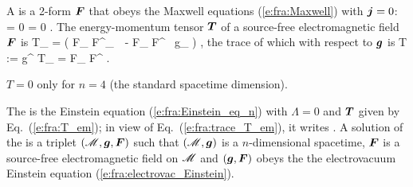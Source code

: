 A  is a 2-form $\bm{F}$
that obeys the Maxwell equations (\ref{e:fra:Maxwell}) with $\bm{j} = 0$:
\be
    \dd {} = 0 \qand  \wnab\cdot{}  = 0 .
\ee
The energy-momentum tensor $\bm{T}$ of a source-free electromagnetic field $\bm{F}$ is
\be \label{e:fra:T_em}
    T_{\alpha\beta} =  \left( F_{\mu\alpha} F^\mu_{\ \, \beta}
        -  F_{\mu\nu} F^{\mu\nu} \, g_{\alpha\beta} \right) ,
\ee
the trace of which with respect to $\bm{g}$ is
\be \label{e:fra:trace_T_em}
    T := g^{\mu\nu} T_{\mu\nu} =  F_{\mu\nu} F^{\mu\nu} .
\ee
\begin{remark}
$T = 0$ only for $n=4$ (the standard spacetime dimension).
\end{remark}
The  is the Einstein equation (\ref{e:fra:Einstein_eq_n})
with $\Lambda=0$ and $\bm{T}$ given by Eq.~(\ref{e:fra:T_em}); in view of Eq.~(\ref{e:fra:trace_T_em}), it writes
\be \label{e:fra:electrovac_Einstein}
    .
\ee
A solution of the 
is a triplet $(\mathscr{M},\bm{g},\bm{F})$ such that  $(\mathscr{M},\bm{g})$ is a $n$-dimensional spacetime,
$\bm{F}$ is a source-free electromagnetic field on $\mathscr{M}$ and $(\bm{g},\bm{F})$ obeys the
the electrovacuum Einstein equation (\ref{e:fra:electrovac_Einstein}).
